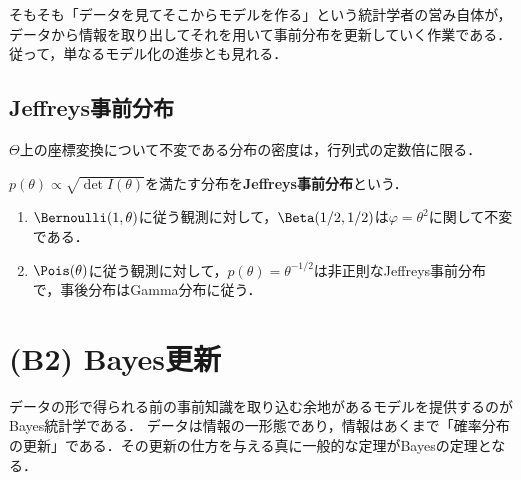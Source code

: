 \documentclass[uplatex,dvipdfmx]{jsreport}
\begin{document}
\begin{remarks}[Bayesの定理の射程]
    そもそも「データを見てそこからモデルを作る」という統計学者の営み自体が，データから情報を取り出してそれを用いて事前分布を更新していく作業である．
    従って，単なるモデル化の進歩とも見れる．
\end{remarks}

\subsection{Jeffreys事前分布}

\begin{tcolorbox}[colframe=ForestGreen, colback=ForestGreen!10!white,breakable,colbacktitle=ForestGreen!40!white,coltitle=black,fonttitle=\bfseries\sffamily,
title=]
    $\Theta$上の座標変換について不変である分布の密度は，行列式の定数倍に限る．
\end{tcolorbox}

\begin{definition}
    $p(\theta)\propto\sqrt{\det I(\theta)}$を満たす分布を\textbf{Jeffreys事前分布}という．
\end{definition}

\begin{example}\mbox{}
    \begin{enumerate}
        \item $\Bernoulli(1,\theta)$に従う観測に対して，$\Beta(1/2,1/2)$は$\varphi=\theta^2$に関して不変である．
        \item $\Pois(\theta)$に従う観測に対して，$p(\theta)=\theta^{-1/2}$は非正則なJeffreys事前分布で，事後分布はGamma分布に従う．
    \end{enumerate}
\end{example}

\section{(B2) Bayes更新}

\begin{tcolorbox}[colframe=ForestGreen, colback=ForestGreen!10!white,breakable,colbacktitle=ForestGreen!40!white,coltitle=black,fonttitle=\bfseries\sffamily,
title=データ分析の騎手]
    データの形で得られる前の事前知識を取り込む余地があるモデルを提供するのがBayes統計学である．
    データは情報の一形態であり，情報はあくまで「確率分布の更新」である．その更新の仕方を与える真に一般的な定理がBayesの定理となる．
\end{tcolorbox}
\end{document}
